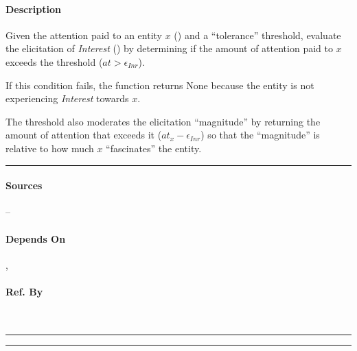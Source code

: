 \paragraph{Description} Given the attention paid to an entity $x$
() and a ``tolerance'' threshold, evaluate the elicitation
of \textit{Interest} () by determining if the
amount of attention paid to $x$ exceeds the threshold ($at > \epsilon_{Inr}$).

If this condition fails, the function returns None because the entity is not
experiencing \textit{Interest} towards $x$.

The threshold also moderates the elicitation ``magnitude'' by returning the
amount of attention that exceeds it ($\mathit{at}_x - \epsilon_{Inr}$) so that
the ``magnitude'' is relative to how much $x$ ``fascinates'' the entity.
\\\hrule

\paragraph{Sources} --

\paragraph{Depends On} , 

\paragraph{Ref. By}  \\\hrule\vspace{0.5mm}\hrule

~\newline

